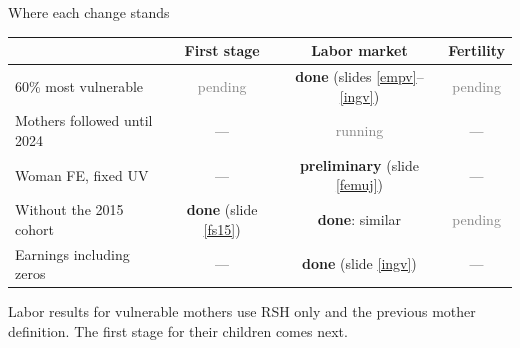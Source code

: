 \documentclass[aspectratio=169,10pt]{beamer}
\newcommand{\takeaway}[1]{\par\vspace{6pt}{\small\textcolor{steel}{$\Rightarrow$}\ \textbf{\textcolor{navy}{#1}}}}
\begin{document}
\begin{frame}{Where each change stands}
\begin{center}
\footnotesize
\renewcommand{\arraystretch}{1.35}
\begin{tabular}{@{}lccc@{}}
\toprule
 & \textbf{First stage} & \textbf{Labor market} & \textbf{Fertility} \\
\midrule
60\% most vulnerable & \textcolor{graytext}{pending} & \textbf{done} (slides \ref{empv}--\ref{ingv}) & \textcolor{graytext}{pending} \\
Mothers followed until 2024 & --- & \textcolor{graytext}{running} & --- \\
Woman FE, fixed UV & --- & \textbf{preliminary} (slide \ref{femuj}) & --- \\
Without the 2015 cohort & \textbf{done} (slide \ref{fs15}) & \textbf{done}: similar & \textcolor{graytext}{pending} \\
Earnings including zeros & --- & \textbf{done} (slide \ref{ingv}) & --- \\
\bottomrule
\end{tabular}
\end{center}
\vspace{4pt}
{\footnotesize Labor results for vulnerable mothers use RSH only and the previous mother definition. The first stage for their children comes next.}
\takeaway{Labor results already reflect the vulnerable sample; first stage and fertility come next.}
\end{frame}
\end{document}
